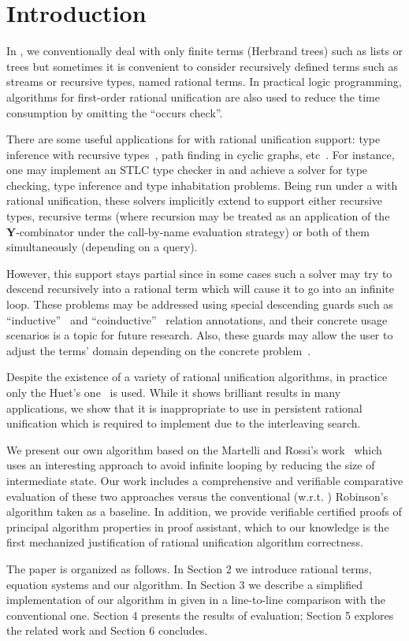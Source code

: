 \section{Introduction}

In \miniKanren, we conventionally deal with only finite terms (Herbrand trees) such as lists or trees but sometimes it is convenient to consider recursively defined terms such as streams or recursive types, named rational terms. In practical logic programming, algorithms for first-order rational unification are also used to reduce the time consumption by omitting the ``occurs check''.

There are some useful applications for \miniKanren with rational unification support: type inference with recursive types~\cite{domoratskiy2024relational}, path finding in cyclic graphs, etc~\cite{simon2006coinductive}. For instance, one may implement an STLC type checker in \miniKanren and achieve a solver for type checking, type inference and type inhabitation problems. Being run under a \miniKanren with rational unification, these solvers implicitly extend to support either recursive types, recursive terms (where recursion may be treated as an application of the \textbf{Y}-combinator under the call-by-name evaluation strategy) or both of them simultaneously (depending on a query).

However, this support stays partial since in some cases such a solver may try to descend recursively into a rational term which will cause it to go into an infinite loop. These problems may be addressed using special descending guards such as ``inductive''~\cite{bol1991analysis} and ``coinductive''~\cite{simon2006coinductive} relation annotations, and their concrete usage scenarios is a topic for future research. Also, these guards may allow the user to adjust the terms' domain depending on the concrete problem~\cite{dagnino2020flexible}.

Despite the existence of a variety of rational unification algorithms, in practice only the Huet's one~\cite{huet1976resolution} is used.
While it shows brilliant results in many applications, we show that it is inappropriate to use in persistent rational unification which
is required to implement \miniKanren due to the interleaving search.

We present our own algorithm based on the Martelli and Rossi's work~\cite{martelli1984efficient} which uses an interesting approach to avoid infinite looping by reducing the size of intermediate state.
Our work includes a comprehensive and verifiable comparative evaluation of these two approaches versus the conventional (w.r.t. \miniKanren) Robinson's algorithm taken as a baseline.
In addition, we provide verifiable certified proofs of principal algorithm properties in \Rocq proof assistant, which to our knowledge is the first mechanized justification of rational unification algorithm correctness.

The paper is organized as follows. In Section 2 we introduce rational terms, equation systems and our algorithm. In Section 3 we describe a simplified implementation of our algorithm in \OCaml given in a line-to-line comparison with the conventional one. Section 4 presents the results of evaluation;
Section 5 explores the related work and Section 6 concludes.
